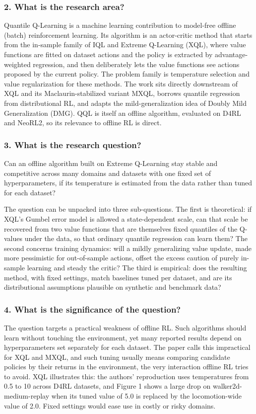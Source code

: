\documentclass[11pt]{article}
\newcommand{\question}[1]{\subsubsection*{#1}}
\begin{document}
\question{2. What is the research area?}

Quantile Q-Learning is a machine learning contribution to model-free offline (batch) reinforcement learning. Its algorithm is an actor-critic method that starts from the in-sample family of IQL and Extreme Q-Learning (XQL), where value functions are fitted on dataset actions and the policy is extracted by advantage-weighted regression, and then deliberately lets the value functions see actions proposed by the current policy. The problem family is temperature selection and value regularization for these methods. The work sits directly downstream of XQL and its Maclaurin-stabilized variant MXQL, borrows quantile regression from distributional RL, and adapts the mild-generalization idea of Doubly Mild Generalization (DMG). QQL is itself an offline algorithm, evaluated on D4RL and NeoRL2, so its relevance to offline RL is direct.

\question{3. What is the research question?}

Can an offline algorithm built on Extreme Q-Learning stay stable and competitive across many domains and datasets with one fixed set of hyperparameters, if its temperature is estimated from the data rather than tuned for each dataset?

The question can be unpacked into three sub-questions. The first is theoretical: if XQL's Gumbel error model is allowed a state-dependent scale, can that scale be recovered from two value functions that are themselves fixed quantiles of the Q-values under the data, so that ordinary quantile regression can learn them? The second concerns training dynamics: will a mildly generalizing value update, made more pessimistic for out-of-sample actions, offset the excess caution of purely in-sample learning and steady the critic? The third is empirical: does the resulting method, with fixed settings, match baselines tuned per dataset, and are its distributional assumptions plausible on synthetic and benchmark data?

\question{4. What is the significance of the question?}

The question targets a practical weakness of offline RL. Such algorithms should learn without touching the environment, yet many reported results depend on hyperparameters set separately for each dataset. The paper calls this impractical for XQL and MXQL, and such tuning usually means comparing candidate policies by their returns in the environment, the very interaction offline RL tries to avoid. XQL illustrates this: the authors' reproduction uses temperatures from 0.5 to 10 across D4RL datasets, and Figure 1 shows a large drop on walker2d-medium-replay when its tuned value of 5.0 is replaced by the locomotion-wide value of 2.0. Fixed settings would ease use in costly or risky domains.
\end{document}
